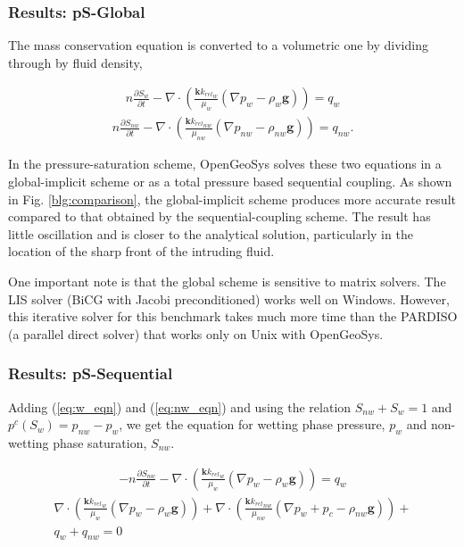\subsubsection*{Results: pS-Global}
The mass conservation equation is converted to a volumetric one by dividing through by fluid density,

\begin{align}
n\frac{{\partial S_{w}}}{{\partial t }} -
\nabla \cdot \left({\frac{{\mathbf k {k_{rel}}_w }}{{\mu_w }}\left( {\nabla p_w - \rho _w
\mathbf g} \right)} \right) = q_w
\label{eq:w_eqn}
\end{align}
\begin{align}
n\frac{{\partial S_{nw}}}{{\partial t }} -
\nabla \cdot \left({\frac{{\mathbf k {k_{rel}}_{nw} }}{{\mu_{nw} }}\left( {\nabla p_{nw} - \rho _{nw}\mathbf g} \right)} \right) = q_{nw}.
\label{eq:nw_eqn}
\end{align}

In the pressure-saturation scheme, OpenGeoSys solves these two equations in a global-implicit scheme or as a total pressure based sequential coupling. As shown in Fig. \ref{blg:comparison}, the global-implicit scheme produces more accurate result compared to that obtained by the sequential-coupling scheme. The result has little oscillation and is closer to the analytical solution, particularly in the location of the sharp front of the intruding fluid.

One important note is that the global scheme is sensitive to matrix solvers. The LIS solver (BiCG with Jacobi preconditioned) works well on Windows. However, this iterative solver for this benchmark takes much more time than the PARDISO (a parallel direct solver) that works only on Unix with OpenGeoSys.

\subsubsection*{Results: pS-Sequential}
Adding (\ref{eq:w_eqn}) and (\ref{eq:nw_eqn}) and using the relation $S_{nw}+ S_w = 1$ and $p^{c}(S_w) = p_{nw} - p_w$, we get the equation for wetting phase pressure, $p_{w}$ and non-wetting phase saturation, $S_{nw}$.

\begin{align}
 - n\frac{{\partial S_{nw}}}{{\partial t }} -
\nabla \cdot \left({\frac{{\mathbf k {k_{rel}}_w }}{{\mu_w }}\left( {\nabla p_w - \rho _w
\mathbf g} \right)} \right) = q_w
\label{eq:wfn_eqn}
\end{align}
\begin{align}
\nabla \cdot \left({\frac{{\mathbf k {k_{rel}}_w }}{{\mu_w }}\left( {\nabla p_w - \rho _w
\mathbf g} \right)} \right) +
\nabla \cdot \left({\frac{{\mathbf k {k_{rel}}_{nw} }}{{\mu_{nw} }}\left( {\nabla {p_w+p_c} - \rho _{nw}\mathbf g} \right)} \right) + \nonumber\\q_w + q_{nw} =0
\label{eq:nwfn_eqn}
\end{align}

